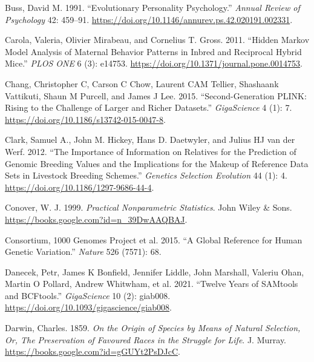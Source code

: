 \documentclass[
]{book}
\newlength{\cslhangindent}
\newlength{\cslentryspacingunit} %
\newenvironment{CSLReferences}[2] %
 {%
  \setlength{\parindent}{0pt}
  \ifodd #1
  \let\oldpar\par
  \def\par{\hangindent=\cslhangindent\oldpar}
  \fi
  \setlength{\parskip}{#2\cslentryspacingunit}
 }%
 {}
\begin{document}
\begin{CSLReferences}{1}{0}
\leavevmode{}%
Buss, David M. 1991. {``Evolutionary Personality Psychology.''} \emph{Annual Review of Psychology} 42: 459--91. \url{https://doi.org/10.1146/annurev.ps.42.020191.002331}.

\leavevmode{}%
Carola, Valeria, Olivier Mirabeau, and Cornelius T. Gross. 2011. {``Hidden {Markov Model Analysis} of {Maternal Behavior Patterns} in {Inbred} and {Reciprocal Hybrid Mice}.''} \emph{PLOS ONE} 6 (3): e14753. \url{https://doi.org/10.1371/journal.pone.0014753}.

\leavevmode{}%
Chang, Christopher C, Carson C Chow, Laurent CAM Tellier, Shashaank Vattikuti, Shaun M Purcell, and James J Lee. 2015. {``Second-Generation {PLINK}: Rising to the Challenge of Larger and Richer Datasets.''} \emph{GigaScience} 4 (1): 7. \url{https://doi.org/10.1186/s13742-015-0047-8}.

\leavevmode{}%
Clark, Samuel A., John M. Hickey, Hans D. Daetwyler, and Julius HJ van der Werf. 2012. {``The Importance of Information on Relatives for the Prediction of Genomic Breeding Values and the Implications for the Makeup of Reference Data Sets in Livestock Breeding Schemes.''} \emph{Genetics Selection Evolution} 44 (1): 4. \url{https://doi.org/10.1186/1297-9686-44-4}.

\leavevmode{}%
Conover, W. J. 1999. \emph{Practical {Nonparametric Statistics}}. {John Wiley \& Sons}. \url{https://books.google.com?id=n_39DwAAQBAJ}.

\leavevmode{}%
Consortium, 1000 Genomes Project et al. 2015. {``A Global Reference for Human Genetic Variation.''} \emph{Nature} 526 (7571): 68.

\leavevmode{}%
Danecek, Petr, James K Bonfield, Jennifer Liddle, John Marshall, Valeriu Ohan, Martin O Pollard, Andrew Whitwham, et al. 2021. {``Twelve Years of {SAMtools} and {BCFtools}.''} \emph{GigaScience} 10 (2): giab008. \url{https://doi.org/10.1093/gigascience/giab008}.

\leavevmode{}%
Darwin, Charles. 1859. \emph{On the {Origin} of {Species} by {Means} of {Natural Selection}, {Or}, {The Preservation} of {Favoured Races} in the {Struggle} for {Life}}. {J. Murray}. \url{https://books.google.com?id=gGUYt2PsDJcC}.


\end{CSLReferences}
\end{document}
